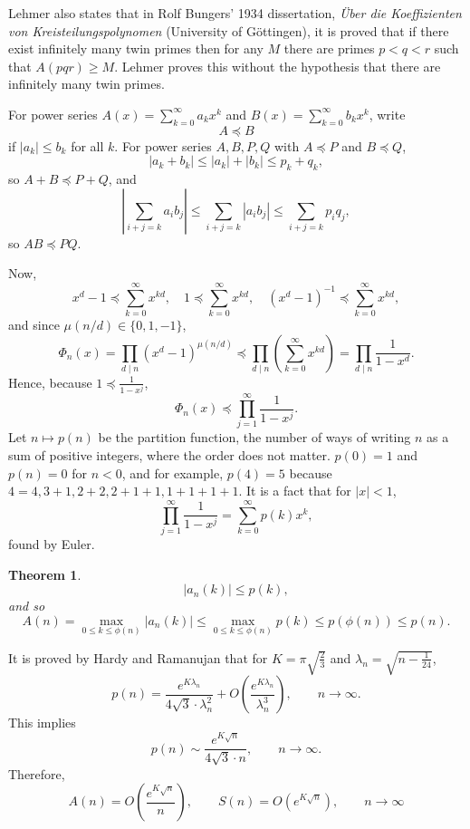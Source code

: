 \documentclass{amsart}
\newtheorem{theorem}{Theorem}
\theoremstyle{definition}
\begin{document}
Lehmer also states that in Rolf Bungers' 1934 dissertation, {\em \"Uber die Koeffizienten von Kreisteilungspolynomen} (University of G\"ottingen), 
it is proved that if there exist infinitely many twin primes then 
for any $M$ there are primes $p<q<r$ such that $A(pqr) \geq M$. Lehmer proves this without
the hypothesis that there are infinitely many twin primes.



For power series $A(x) = \sum_{k=0}^\infty a_k x^k$ and $B(x)=\sum_{k=0}^\infty b_k x^k$, write
\[
A \preceq B
\]
if $|a_k| \leq b_k$ for all $k$.
For power series $A,B,P,Q$ with $A \preceq P$ and $B \preceq Q$,
\[
|a_k+b_k| \leq |a_k|+|b_k| \leq p_k+q_k,
\]
so $A+B \preceq P+Q$, and
\[
\left| \sum_{i+j=k} a_i b_j \right| \leq \sum_{i+j=k} |a_i b_j|
\leq \sum_{i+j=k} p_i q_j,
\]
so $AB \preceq PQ$. 

Now,  
\[
x^d-1 \preceq \sum_{k=0}^\infty x^{kd},
\quad 1 \preceq \sum_{k=0}^\infty x^{kd},
\quad (x^d-1)^{-1} \preceq \sum_{k=0}^\infty x^{kd},
\]
 and since $\mu(n/d) \in \{0,1,-1\}$,
\begin{equation}
\Phi_n(x) = \prod_{d \mid n} (x^d-1)^{\mu(n/d)}
\preceq
\prod_{d \mid n} \left( \sum_{k=0}^\infty x^{kd} \right)
=\prod_{d \mid n} \frac{1}{1-x^d}.
\label{dproduct}
\end{equation}
Hence, because $1 \preceq \frac{1}{1-x^j}$,
\[
\Phi_n(x)  
\preceq \prod_{j=1}^\infty \frac{1}{1-x^j}.
\]
Let $n \mapsto p(n)$ be the partition function, the number of ways of writing
$n$ as a sum of positive integers, where the order does not matter. $p(0)=1$ and $p(n)=0$ for $n<0$, and
for example, $p(4)=5$ because $4=4,3+1,2+2,2+1+1,1+1+1+1$. It is a  fact that for $|x|<1$,
\[
 \prod_{j=1}^\infty \frac{1}{1-x^j} = \sum_{k=0}^\infty p(k) x^k,
\]
found by Euler.

\begin{theorem}
\[
|a_n(k)| \leq p(k),
\]
and so 
\[
A(n) = \max_{0 \leq k \leq \phi(n)} |a_n(k)| \leq
\max_{0 \leq k \leq \phi(n)} p(k)
\leq p(\phi(n)) \leq p(n).
\]
\label{partition}
\end{theorem}

It is proved by Hardy and Ramanujan \cite[p.~166, Chapter VII]{chandra} that
for $K=\pi \sqrt{\frac{2}{3}}$ and $\lambda_n = \sqrt{n-\frac{1}{24}}$, 
\[
p(n) = \frac{e^{K\lambda_n}}{4\sqrt{3}\cdot \lambda_n^2} + O\left( \frac{e^{K\lambda_n}}{\lambda_n^3}\right),
\qquad n \to \infty.
\]
This implies 
\[
p(n) \sim \frac{e^{K \sqrt{n}}}{4\sqrt{3} \cdot n}, \qquad n \to \infty.
\]
Therefore,
\[
A(n) = O\left(\frac{e^{K\sqrt{n}}}{n}\right),\qquad
S(n) = O(e^{K\sqrt{n}}),
\qquad n \to \infty
\]
\end{document}
